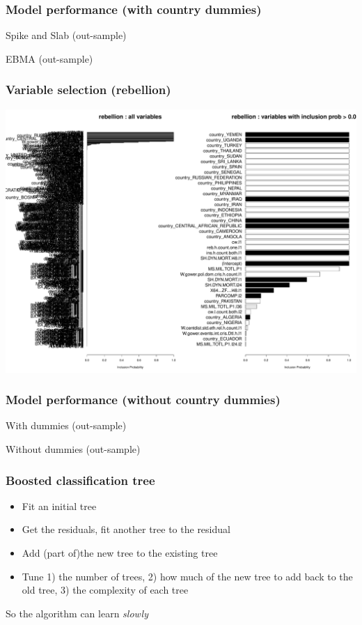\documentclass{beamer}
\begin{document}

\begin{frame}
\frametitle{Model performance (with country dummies)}
\begin{table}[H]
\centering
	
	\caption{Spike and Slab (out-sample)}
\end{table}
\begin{table}
	
	\caption{EBMA (out-sample)}
\end{table}
\end{frame}

\begin{frame}
\frametitle{Variable selection (rebellion)}
\includegraphics[width=\textwidth]{fig/spikeslab_rebellionvar}
\end{frame}

\begin{frame}
\frametitle{Model performance (without country dummies)}

\begin{table}[H]
	
	\caption{With dummies (out-sample)}
\end{table}

\begin{table}
	
	\caption{Without dummies (out-sample)}
\end{table}
\end{frame}

\begin{frame}
\frametitle{Boosted classification tree}
\begin{itemize}
\item Fit an initial tree
\item Get the residuals, fit another tree to the residual
\item Add (part of)the new tree to the existing tree
\item Tune 1) the number of trees, 2) how much of the new tree to add back to the old tree, 3) the complexity of each tree
\end{itemize}

So the algorithm can learn \textit{slowly}
\end{frame}
\end{document}
